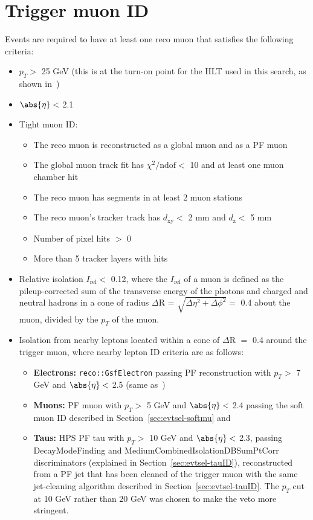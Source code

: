 \section{Trigger muon ID\label{sec:evtsel-triggermu}}

Events are required to have at least one reco muon that satisfies the following criteria:
\begin{itemize}
	\item $p_T >$ 25 GeV (this is at the turn-on point for the HLT used in this search, as shown in~\cite{CMS:muonhlttwiki})
	\item $\abs{\eta} <$ 2.1
	\item Tight muon ID:
	\begin{itemize}
		\item The reco muon is reconstructed as a global muon and as a PF muon
		\item The global muon track fit has $\chi^{2}/\text{ndof} <$ 10 and at least one muon chamber hit 
		\item The reco muon has segments in at least 2 muon stations
		\item The reco muon's tracker track has $d_{\text{xy}} <$ 2 mm and $d_{\text{z}} <$ 5 mm
		\item Number of pixel hits $>$ 0
		\item More than 5 tracker layers with hits
	\end{itemize}
	\item Relative isolation $I_{\text{rel}} <$ 0.12, where the $I_{\text{rel}}$ of a muon is defined as the pileup-corrected sum of the transverse energy of the photons and charged and neutral hadrons in a cone of radius $\Delta$R = $\sqrt{\Delta\eta^{2} + \Delta\phi^{2}} =$ 0.4 about the muon, divided by the $p_T$ of the muon.
        \item Isolation from nearby leptons located within a cone of $\Delta$R $=$ 0.4 around the trigger muon, where nearby lepton ID criteria are as follows:
          \begin{itemize}
          \item \textbf{Electrons:} \texttt{reco::GsfElectron} passing PF reconstruction with $p_T >$ 7 GeV and $\abs{\eta} <$ 2.5 (same as~\cite{Chatrchyan:2013mxa})
          \item \textbf{Muons:} PF muon with $p_T >$ 5 GeV and $\abs{\eta} <$ 2.4 passing the soft muon ID described in Section~\ref{sec:evtsel-softmu} and~\cite{CMS:2010uta}
          \item \textbf{Taus:} HPS PF tau with $p_T >$ 10 GeV and $\abs{\eta} <$ 2.3, passing DecayModeFinding and MediumCombinedIsolationDBSumPtCorr discriminators (explained in Section~\ref{sec:evtsel-tauID}), reconstructed from a PF jet that has been cleaned of the trigger muon with the same jet-cleaning algorithm described in Section~\ref{sec:evtsel-tauID}. The $p_T$ cut at 10 GeV rather than 20 GeV was chosen to make the veto more stringent.
          \end{itemize}
\end{itemize}


